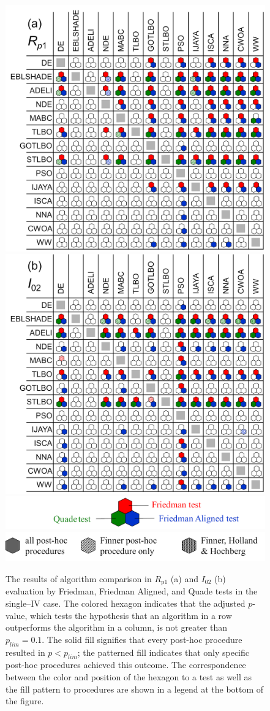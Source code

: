 \documentclass[a4paper,fleqn]{cas-dc}
\begin{document}
\begin{figure}[]
	\centering
		\includegraphics[width=.495\textwidth]{Rp1shotN1}
        \includegraphics[width=.495\textwidth]{I02shotN1}
        \includegraphics[width=.48\textwidth]{Titleshot11N}
		\includegraphics[width=.48\textwidth]{Titleshot21N}
	  \caption{The results of algorithm comparison in $R_\mathrm{p1}$ (a) and $I_{02}$ (b) evaluation
               by Friedman, Friedman Aligned, and Quade tests in the single--IV case.
               The colored hexagon indicates that the adjusted $p$-value,
               which tests the hypothesis that an algorithm in a row outperforms the algorithm in a column,
               is not greater than $p_{lim}=0.1$.
               The solid fill signifies that every post-hoc procedure resulted in $p<p_{lim}$;
               the patterned fill indicates that only specific post-hoc procedures achieved this outcome.
               The correspondence between the color and position of the hexagon to a test
               as well as the fill pattern to procedures are shown in a legend at the bottom of the figure.
               }\label{figN1RezSingleIV}
\end{figure}
\end{document}
